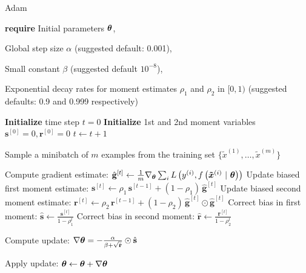 \documentclass[11pt,compress,t,notes=noshow, xcolor=table]{beamer}
\begin{document}
\begin{framev}{Adam}
\begin{algorithm}[H]
\scriptsize
\caption{Adam}
\begin{algorithmic}[1]
\State \textbf{require} Initial parameters $\bm{\theta}$, \strut Global step size $\alpha$ (suggested default: 0.001), \strut Small constant $\beta$ (suggested default $10^{-8}$), \strut Exponential decay rates for moment estimates $\rho_1$ and $\rho_2$ in $[0,1)$ (suggested defaults: 0.9 and 0.999 respectively) \strut 
\State \textbf{Initialize} time step $t = 0$
\State \textbf{Initialize} 1st and 2nd moment variables $\mathbf{s}^{[0]} = 0, \mathbf{r}^{[0]} = 0$
\State $t \leftarrow t + 1$
\State \parbox[t]{\dimexpr\linewidth-\algorithmicindent}{Sample a minibatch of $m$ examples from the training set $\{\tilde{x}^{(1)},\dots,\tilde{x}^{(m)}\}$ \strut}
\State Compute gradient estimate: $\hat{\mathbf{g}}^{[t]} \leftarrow \frac{1}{m} \nabla_{\bm{\theta}} \sum_{i} L\left(y^{(i)}, f\left(\bm{\tilde{x}}^{(i)} ~|~ \bm{\theta}\right)\right)$
\State Update biased first moment estimate: $\mathbf{s}^{[t]} \leftarrow \rho_1 \, \mathbf{s}^{[t-1]}  + (1 - \rho_1) \, \hat{\mathbf{g}}^{[t]}$
\State Update biased second moment estimate: $\mathbf{r}^{[t]} \leftarrow \rho_2 \, \mathbf{r}^{[t-1]}  + (1 - \rho_2) \, \hat{\mathbf{g}}^{[t]} \odot \hat{\mathbf{g}}^{[t]}$
\State Correct bias in first moment: $\hat{\mathbf{s}} \leftarrow \frac{\mathbf{s}^{[t]} }{1-\rho_1^t}$
\State Correct bias in second moment: $\hat{\mathbf{r}} \leftarrow \frac{\mathbf{r}^{[t]} }{1-\rho_2^t}$
\State \parbox[t]{\dimexpr\linewidth-\algorithmicindent}{Compute update: $\nabla\bm{\theta} = - \frac{\alpha}{\beta +\sqrt{\hat{\mathbf{r}}}} \odot \hat{\mathbf{s}}$ \strut}
\State Apply update: $\bm{\theta} \leftarrow \bm{\theta} + \nabla\bm{\theta}$
\EndWhile
\end{algorithmic}
\end{algorithm}
\end{framev}
\end{document}
